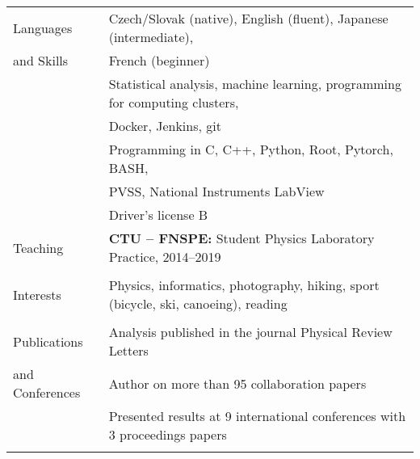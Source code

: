 \documentclass[a4paper,11pt,oneside]{article}
\begin{document}
\newpage

\noindent  \begin{tabular}{@{} l l}
  \Large{Languages}   & Czech/Slovak (native), English (fluent), Japanese (intermediate), \\
\Large{and Skills}    & French (beginner)  \\[.2cm]
     & Statistical analysis, machine learning, programming for computing clusters, \\
     & Docker, Jenkins, git\\[.2cm]
     & Programming in C, C++, Python, Root, Pytorch, BASH,  \\
     & PVSS, National Instruments LabView \\[.2cm]
     & Driver's license B\\[.4cm]
\Large{Teaching} & \textbf{CTU -- FNSPE:} Student Physics Laboratory Practice, 2014--2019\\
     \\[.1cm]
\Large{Interests}    
     & Physics, informatics, photography, hiking, sport (bicycle, ski, canoeing), reading \\
     \\[.1cm]
\Large{Publications}   & Analysis published in the journal Physical Review Letters \\
\Large{and Conferences} & Author on more than 95 collaboration papers \\[.2cm]
     & Presented results at 9 international conferences with 3 proceedings papers\\
     & \\[.5cm]
\end{tabular}
\end{document}
